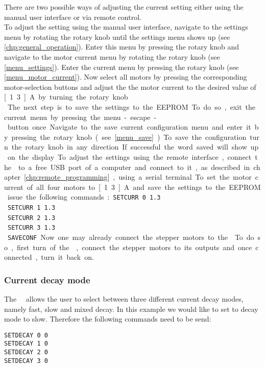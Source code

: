 There are two possible ways of adjusting the current setting either using the manual user interface or via remote control.\\
To adjust the setting using the manual user interface, navigate to the settings menu by rotating the rotary knob until the settings menu shows up (see \ref{chp:general_operation}). Enter this menu by pressing the rotary knob and navigate to the motor current menu by rotating the rotary knob (see \ref{menu_settings}). Enter the current menu by pressing the rotary knob (see \ref{menu_motor_current}). Now select all motors by pressing the corresponding motor-selection buttons and adjust the the motor current to the desired value of \unit[1.3]{A} by turning the rotary knob.\\
The next step is to save the settings to the EEPROM. To do so, exit the current menu by pressing the menu-escape-button once. Navigate to the save current configuration menu and enter it by pressing the rotary knob (see \ref{menu_save}). To save the configuration turn the rotary knob in any direction. If successful the word saved will show up on the display.

To adjust the settings using the remote interface, connect the \productName ~to a free USB port of a computer and connect to it, as described in chapter \ref{chp:remote_programming}, using a serial terminal. To set the motor current of all four motors to \unit[1.3]{A} and save the settings to the EEPROM issue the following commands:

\texttt{SETCURR 0 1.3}\\
\texttt{SETCURR 1 1.3}\\
\texttt{SETCURR 2 1.3}\\
\texttt{SETCURR 3 1.3}\\
\texttt{SAVECONF}

Now one may already connect the stepper motors to the \productName . To do so, first turn of the \productName , connect the stepper motors to its outputs and once connected, turn it back on.

\subsubsection{Current decay mode}
The \productNumber ~\productName ~allows the user to select between three different current decay modes, namely fast, slow and mixed decay. In this example we would like to set to decay mode to slow. Therefore the following commands need to be send:

\texttt{SETDECAY 0 0}\\
\texttt{SETDECAY 1 0}\\
\texttt{SETDECAY 2 0}\\
\texttt{SETDECAY 3 0}


